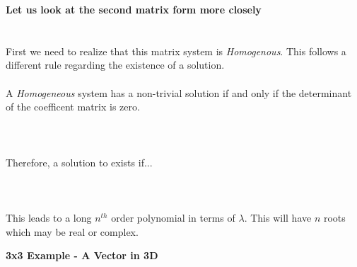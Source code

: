 \documentclass[11pt]{article}
\begin{document}
\begin{itemize}
{		 	

\newpage
\item  \textbf{\LARGE Let us look at the second matrix form more closely}\\\\

 \\

First we need to realize that this matrix system is {\it Homogenous}. This follows a different rule regarding the existence of a solution.\\\\
 A {\it Homogeneous} system has a non-trivial solution if and only if the determinant of the coefficent matrix is zero.\\\\

\\\\

Therefore, a solution to  exists if...\\\\
 \\\\

This leads to a long $n^{th}$ order polynomial in terms of $\lambda$. This will have $n$ roots which may be real or complex.
\newpage
\item  \textbf{\LARGE 3x3 Example - A Vector in 3D} \\\\

}
\end{itemize}
\end{document}
